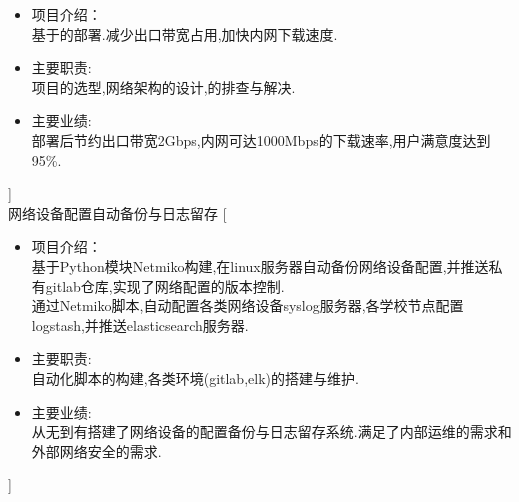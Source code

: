 \documentclass[zh]{resume}
\begin{document}
\begin{experiences}
\begin{itemize}
    \item 项目介绍：\\
    基于的部署.减少出口带宽占用,加快内网下载速度.
    \item 主要职责: \\
    项目的选型,网络架构的设计,的排查与解决.
    \item 主要业绩: \\
    部署后节约出口带宽2Gbps,内网可达1000Mbps的下载速率,用户满意度达到95\%.
  \end{itemize}]
  \\
  {网络设备配置自动备份与日志留存}%
  [\begin{itemize}
    \item 项目介绍：\\
    基于Python模块Netmiko构建,在linux服务器自动备份网络设备配置,并推送私有gitlab仓库,实现了网络配置的版本控制.\\
    通过Netmiko脚本,自动配置各类网络设备syslog服务器,各学校节点配置logstash,并推送elasticsearch服务器.
    \item 主要职责: \\
    自动化脚本的构建,各类环境(gitlab,elk)的搭建与维护.
    \item 主要业绩: \\
    从无到有搭建了网络设备的配置备份与日志留存系统.满足了内部运维的需求和外部网络安全的需求.
  \end{itemize}]
\end{experiences}
\end{document}
